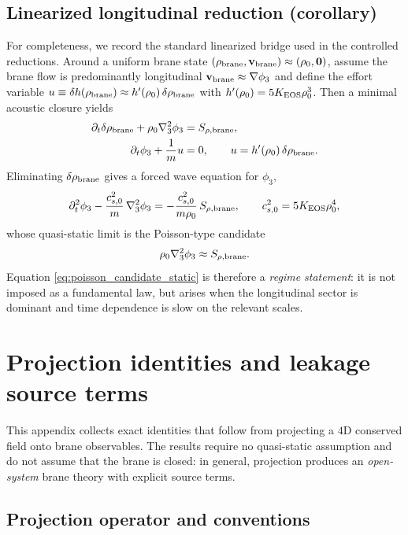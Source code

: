 \documentclass[11pt]{article}
\begin{document}
\subsection{Linearized longitudinal reduction (corollary)}
For completeness, we record the standard linearized bridge used in the controlled
reductions.  Around a uniform brane state $(\rho_{\rm brane},\mathbf{v}_{\rm brane})\approx (\rho_0,\mathbf{0})$,
assume the brane flow is predominantly longitudinal $\mathbf{v}_{\rm brane}\approx \nabla \phi_3$ and define
the effort variable $u\equiv \delta h(\rho_{\rm brane})\approx h'(\rho_0)\,\delta\rho_{\rm brane}$ with
$h'(\rho_0)=5K_{\rm EOS}\rho_0^3$.  Then a minimal acoustic closure yields
\begin{align}
\partial_t \delta\rho_{\rm brane} + \rho_0 \nabla_3^2 \phi_3 &= S_{\rho,\rm brane},
\\
\partial_t \phi_3 + \frac{1}{m}u &= 0,
\qquad u = h'(\rho_0)\,\delta\rho_{\rm brane}.
\end{align}
Eliminating $\delta\rho_{\rm brane}$ gives a forced wave equation for $\phi_3$,
\begin{align}
\partial_t^2 \phi_3 - \frac{c_{s,0}^2}{m}\,\nabla_3^2 \phi_3
= -\frac{c_{s,0}^2}{m\rho_0}\,S_{\rho,\rm brane},
\qquad c_{s,0}^2=5K_{\rm EOS}\rho_0^4,
\label{eq:app_forced_wave_phi}
\end{align}
whose quasi-static limit is the Poisson-type candidate
\begin{align}
\rho_0 \nabla_3^2 \phi_3 \approx S_{\rho,\rm brane}.
\label{eq:poisson_candidate_static}
\end{align}
Equation \eqref{eq:poisson_candidate_static} is therefore a \emph{regime statement}:
it is not imposed as a fundamental law, but arises when the longitudinal sector is
dominant and time dependence is slow on the relevant scales.

\section{Projection identities and leakage source terms}
\label{app:projection_leakage}

This appendix collects exact identities that follow from projecting a
$4$D conserved field onto brane observables. The results require no
quasi-static assumption and do not assume that the brane is closed: in general,
projection produces an \emph{open-system} brane theory with explicit source terms.

\subsection{Projection operator and conventions}
\label{app:projection_operator}
\end{document}
